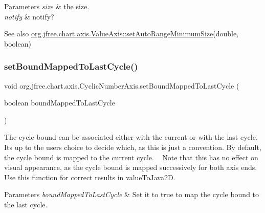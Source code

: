 \begin{DoxyParams}{Parameters}
{\em size} & the size. \\
\hline
{\em notify} & notify?\\
\hline
\end{DoxyParams}
\begin{DoxySeeAlso}{See also}
\mbox{\hyperlink{classorg_1_1jfree_1_1chart_1_1axis_1_1_value_axis_a70efada90ae6f8ed6f4cc34052adec3f}{org.\+jfree.\+chart.\+axis.\+Value\+Axis\+::set\+Auto\+Range\+Minimum\+Size}}(double, boolean) 
\end{DoxySeeAlso}
\mbox{\label{classorg_1_1jfree_1_1chart_1_1axis_1_1_cyclic_number_axis_a4e1bec37f68081a155e6743eae1f1934}} 
\subsubsection{\texorpdfstring{set\+Bound\+Mapped\+To\+Last\+Cycle()}{setBoundMappedToLastCycle()}}
{\footnotesize\ttfamily void org.\+jfree.\+chart.\+axis.\+Cyclic\+Number\+Axis.\+set\+Bound\+Mapped\+To\+Last\+Cycle (\begin{DoxyParamCaption}\item[{boolean}]{bound\+Mapped\+To\+Last\+Cycle }\end{DoxyParamCaption})}

The cycle bound can be associated either with the current or with the last cycle. It\textquotesingle{}s up to the user\textquotesingle{}s choice to decide which, as this is just a convention. By default, the cycle bound is mapped to the current cycle. ~\newline
 Note that this has no effect on visual appearance, as the cycle bound is mapped successively for both axis ends. Use this function for correct results in value\+To\+Java2D.


\begin{DoxyParams}{Parameters}
{\em bound\+Mapped\+To\+Last\+Cycle} & Set it to true to map the cycle bound to the last cycle. \\
\hline
\end{DoxyParams}
\mbox{\label{classorg_1_1jfree_1_1chart_1_1axis_1_1_cyclic_number_axis_a19815a69702a47011236596d21c1117a}} 
